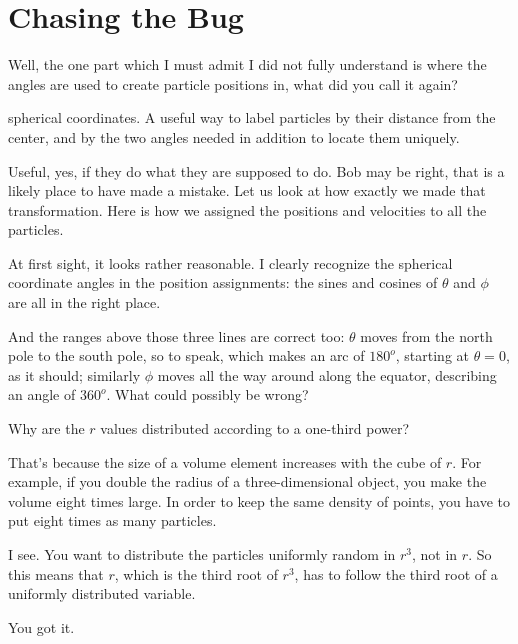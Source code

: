 \cba

\section{Chasing the Bug}

\abc

\bob
Well, the one part which I must admit I did not fully understand is
where the angles are used to create particle positions in, what did
you call it again?

\alice
spherical coordinates.  A useful way to label particles by their
distance from the center, and by the two angles needed in addition to
locate them uniquely.

\carol
Useful, yes, if they do what they are supposed to do.  Bob may be right,
that is a likely place to have made a mistake.  Let us look at how
exactly we made that transformation.  Here is how we assigned the
positions and velocities to all the particles.

\cba


\abc

\alice
At first sight, it looks rather reasonable.  I clearly recognize the
spherical coordinate angles in the position assignments: the sines and
cosines of $\theta$ and $\phi$ are all in the right place.

\carol
And the ranges above those three lines are correct too: $\theta$ moves
from the north pole to the south pole, so to speak, which makes an arc
of $180^o$, starting at $\theta = 0$, as it should; similarly $\phi$
moves all the way around along the equator, describing an angle of $360^o$.
What could possibly be wrong?

\bob
Why are the $r$ values distributed according to a one-third power?

\alice
That's because the size of a volume element increases with the cube of $r$.
For example, if you double the radius of a three-dimensional object,
you make the volume eight times large.  In order to keep the same
density of points, you have to put eight times as many particles.

\bob
I see.  You want to distribute the particles uniformly random in $r^3$,
not in $r$.  So this means that $r$, which is the third root of $r^3$,
has to follow the third root of a uniformly distributed variable.

\alice
You got it.

